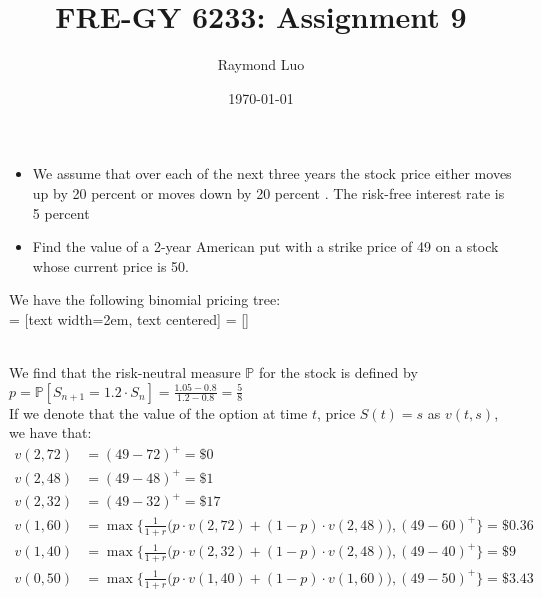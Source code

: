 \documentclass[12pt,twoside, letter]{exam}
\theoremstyle{definition}
\newcommand{\pp}{\mathbb{P}}
\begin{document}
\abovedisplayskip=12pt
\belowdisplayskip=12pt
\abovedisplayshortskip=7pt
\belowdisplayshortskip=10pt
\allowdisplaybreaks

\setlength{\parindent}{18pt}

\title{FRE-GY 6233: Assignment 9}
\author{Raymond Luo}
\date{\today}
\maketitle

  \begin{itemize}
    \item We assume that over each of the next three years the stock price
      either moves up by 20 percent or moves down by 20 percent .
      The risk-free interest rate is 5 percent
    \item Find the value of a 2-year American put with a strike price of 49
      on a stock whose current price is 50.
  \end{itemize}

  \begin{solution}
    We have the following binomial pricing tree: \\
     = [text width=2em, text centered]
     = []
    \\
    We find that the risk-neutral measure $\mathbb{P}$ for the stock is defined by
    $p = \pp[S_{n+1} = 1.2\cdot S_n] = \frac{1.05 - 0.8}{1.2 - 0.8} = \frac{5}{8}$ \\
    If we denote that the value of the option at time $t$, price $S(t) = s$ as $v(t,s)$,
    we have that:
    \begin{align*}
      v(2,72) &= (49- 72)^+ = \$ 0 \\
      v(2,48) &= (49 - 48)^+ = \$ 1 \\
      v(2,32) &= (49 - 32)^+ = \$ 17 \\
      v(1, 60) &= \max\{\frac{1}{1+r}\big(p\cdot v(2,72) + (1-p) \cdot v(2,48)\big), (49 - 60)^+ \}
      = \$ 0.36\\
      v(1, 40) &= \max\{\frac{1}{1+r}\big(p\cdot v(2,32) + (1-p) \cdot v(2,48)\big), (49 - 40)^+ \}
      = \$9 \\
      v(0, 50) &= \max\{\frac{1}{1+r}\big(p\cdot v(1,40) + (1-p) \cdot v(1,60)\big), (49 - 50)^+ \}
      = \$ 3.43\\
    \end{align*}
  \end{solution}
\end{document}
